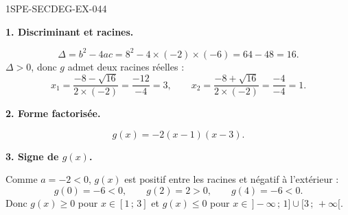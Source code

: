 \begin{corrige}{1SPE-SECDEG-EX-044}

\textbf{1. Discriminant et racines.}


\[
\Delta = b^2 - 4ac = 8^2 - 4 \times (-2) \times (-6) = 64 - 48 = 16.
\]
$\Delta > 0$, donc $g$ admet deux racines réelles :
\[
x_1 = \frac{-8 - \sqrt{16}}{2 \times (-2)} = \frac{-12}{-4} = 3, \qquad x_2 = \frac{-8 + \sqrt{16}}{2 \times (-2)} = \frac{-4}{-4} = 1.
\]

\medskip
\textbf{2. Forme factorisée.}

\[
g(x) = -2(x - 1)(x - 3).
\]

\medskip
\textbf{3. Signe de $g(x)$.}


Comme $a = -2 < 0$, $g(x)$ est positif entre les racines et négatif à l'extérieur :
\[
g(0) = -6 < 0, \qquad g(2) = 2 > 0, \qquad g(4) = -6 < 0.
\]
Donc $g(x) \geqslant 0$ pour $x \in [1\,;\,3]$ et $g(x) \leqslant 0$ pour $x \in \,]-\infty\,;\,1] \cup [3\,;\,+\infty[$.

\end{corrige}
